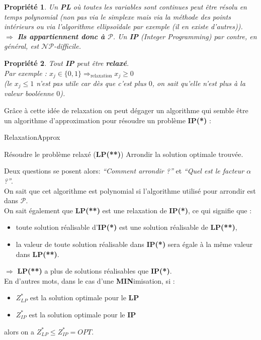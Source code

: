 \documentclass[12pt]{article}
\newcommand{\titre}[1]{\textcolor{title}{#1}}
\newtheorem{propriete}{Propri\'et\'e}[section]
\begin{document}
\begin{propriete}
Un \textbf{\titre{PL}} où toutes les variables sont continues peut être résolu
en temps polynomial (non pas via le simplexe mais via la méthode des points
intérieurs ou via l'algorithme ellipsoïdale par exemple (il en existe
d'autres)).\\
\indent $\Rightarrow$ \textbf{Ils appartiennent donc à $\mathcal{P}$}. Un
\textbf{\titre{IP}} \textit{(Integer Programming)} par contre,
en général, est $\mathcal{NP}$-\textit{difficile}.
\end{propriete}

\begin{propriete}
Tout \textbf{\titre{IP}} peut être \textbf{relaxé}. \\
Par exemple : \(x_j \in \{0,1\} \Rightarrow_{\text{relaxation}} x_j \geq 0\)\\
(le $x_j \leq 1$ n'est pas utile car dès que c'est plus $0$, on sait qu'elle
n'est plus à la valeur booléenne $0$).
\end{propriete}

Grâce à cette idée de relaxation on peut dégager un algorithme qui semble être
un algorithme d'approximation pour résoudre un problème \textbf{IP(*)} :
\begin{algorithm}[h!]
\caption{RelaxationApprox}
\begin{algorithmic}[1]
\STATE Résoudre le problème relaxé (\textbf{LP(**)})
\STATE Arrondir la solution optimale trouvée.
\end{algorithmic}
\end{algorithm}

Deux questions se posent alors: \textit{``Comment arrondir ?''} et
\textit{``Quel est le facteur $\alpha$ ?''}.\\
On sait que cet algorithme est polynomial si l'algorithme utilisé pour arrondir
est dans $\mathcal{P}$. \\
On sait également que \textbf{LP(**)} est une relaxation de \textbf{IP(*)}, ce
qui signifie que :
\begin{itemize}
\item toute solution réalisable d'\textbf{IP(*)} est une solution réalisable de
\textbf{LP(**)},
\item la valeur de toute solution réalisable dans \textbf{IP(*)} sera égale à la
même valeur dans \textbf{LP(**)}.
\end{itemize}
$\Rightarrow$ \textbf{LP(**)} a plus de solutions réalisables que
\textbf{IP(*)}.\\
En d'autres mots, dans le cas d'une \textbf{MIN}imisation, si :
\begin{itemize}
\item $Z^*_{LP}$ est la solution optimale pour le \textbf{LP}
\item $Z^*_{IP}$ est la solution optimale pour le \textbf{IP}
\end{itemize}
alors on a $\boxed{Z^*_{LP} \leq Z^*_{IP} = OPT}$. \\
\end{document}
